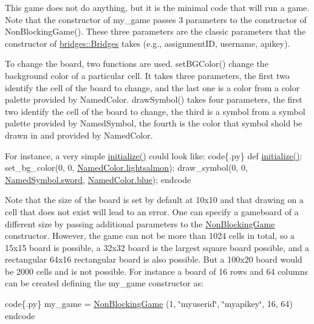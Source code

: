 This game does not do anything, but it is the minimal code that will run a game. Note that the constructor of my\+\_\+game passes 3 parameters to the constructor of Non\+Blocking\+Game(). These three parameters are the classic parameters that the constructor of \hyperlink{classbridges_1_1bridges_1_1_bridges}{bridges\+::\+Bridges} takes (e.\+g., assignment\+ID, username, apikey).

To change the board, two functions are used. set\+B\+G\+Color() change the background color of a particular cell. It takes three parameters, the first two identify the cell of the board to change, and the last one is a color from a color palette provided by Named\+Color. draw\+Symbol() takes four parameters, the first two identify the cell of the board to change, the third is a symbol from a symbol palette provided by Named\+Symbol, the fourth is the color that symbol shold be drawn in and provided by Named\+Color.

For instance, a very simple \hyperlink{classbridges_1_1gamebase_1_1_game_base_a336629d190f1601f1211ca57e4d5427d}{initialize()} could look like\+: code\{.py\} def \hyperlink{classbridges_1_1gamebase_1_1_game_base_a336629d190f1601f1211ca57e4d5427d}{initialize()}\+: set\+\_\+bg\+\_\+color(0, 0, \hyperlink{classbridges_1_1named__color_1_1_named_color_a616e82749b8c7711ede2554ce8e3a879}{Named\+Color.\+lightsalmon}); draw\+\_\+symbol(0, 0, \hyperlink{classbridges_1_1named__symbol_1_1_named_symbol_a02fc79c7bdc9a95febfbcb22ac7079d2}{Named\+Symbol.\+sword}, \hyperlink{classbridges_1_1named__color_1_1_named_color_a145708a26f3f348fb34085de800c6e67}{Named\+Color.\+blue}); endcode

Note that the size of the board is set by default at 10x10 and that drawing on a cell that does not exist will lead to an error. One can specify a gameboard of a different size by passing additional parameters to the \hyperlink{classbridges_1_1non__blocking__game_1_1_non_blocking_game}{Non\+Blocking\+Game} constructor. However, the game can not be more than 1024 cells in total, so a 15x15 board is possible, a 32x32 board is the largest square board possible, and a rectangular 64x16 rectangular board is also possible. But a 100x20 board would be 2000 cells and is not possible. For instance a board of 16 rows and 64 columns can be created defining the my\+\_\+game constructor as\+:

code\{.py\} my\+\_\+game = \hyperlink{classbridges_1_1non__blocking__game_1_1_non_blocking_game}{Non\+Blocking\+Game} (1, \char`\"{}myuserid\char`\"{}, \char`\"{}myapikey\char`\"{}, 16, 64) endcode

